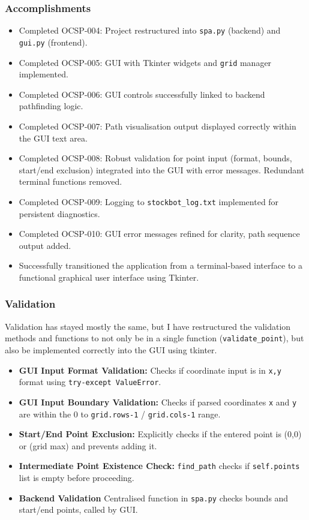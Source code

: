 \subsubsection{Accomplishments}
\begin{itemize}
	\item Completed OCSP-004: Project restructured into \verb|spa.py| (backend) and \verb|gui.py| (frontend).
	\item Completed OCSP-005: GUI with Tkinter widgets and \verb|grid| manager implemented.
	\item Completed OCSP-006: GUI controls successfully linked to backend pathfinding logic.
	\item Completed OCSP-007: Path visualisation output displayed correctly within the GUI text area.
	\item Completed OCSP-008: Robust validation for point input (format, bounds, start/end exclusion) integrated into the GUI with error messages. Redundant terminal functions removed.
	\item Completed OCSP-009: Logging to \verb|stockbot_log.txt| implemented for persistent diagnostics.
	\item Completed OCSP-010: GUI error messages refined for clarity, path sequence output added.
	\item Successfully transitioned the application from a terminal-based interface to a functional graphical user interface using Tkinter.
\end{itemize}

\subsubsection{Validation}

Validation has stayed mostly the same, but I have restructured the validation methods and functions to not only be in a single function (\verb|validate_point|), but also be implemented correctly into the GUI using tkinter.

\begin{itemize}
	\item \textbf{GUI Input Format Validation:} Checks if coordinate input is in \verb|x,y| format using \verb|try-except ValueError|.
	\item \textbf{GUI Input Boundary Validation:} Checks if parsed coordinates \verb|x| and \verb|y| are within the 0 to \verb|grid.rows-1| / \verb|grid.cols-1| range.
	\item \textbf{Start/End Point Exclusion:} Explicitly checks if the entered point is (0,0) or (grid max) and prevents adding it.
	\item \textbf{Intermediate Point Existence Check:} \verb|find_path| checks if \verb|self.points| list is empty before proceeding.
	\item \textbf{Backend Validation} Centralised function in \verb|spa.py| checks bounds and start/end points, called by GUI.
\end{itemize}

